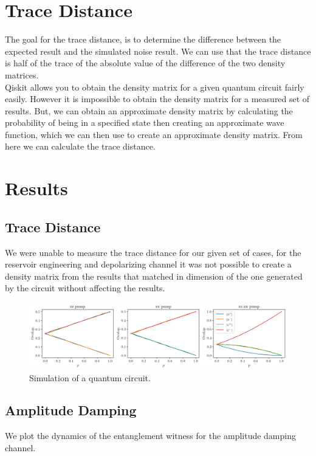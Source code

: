 \documentclass[12pt]{article}
\begin{document}
\section{Trace Distance}
        The goal for the trace distance, is to determine the difference between the expected result and the simulated noise result. We can use that the trace distance is half of the trace of the absolute value of the difference of the two density matrices. \\
        Qiskit allows you to obtain the density matrix for a given quantum circuit fairly easily. However it is impossible to obtain the density matrix for a measured set of results. But, we can obtain an approximate density matrix by calculating the probability of being in a specified state then creating an approximate wave function, which we can then use to create an approximate density matrix. From here we can calculate the trace distance.  

  \section{Results}
  \subsection{Trace Distance}
        We were unable to measure the trace distance for our given set of cases, for the reservoir engineering and depolarizing channel it was not possible to create a density matrix from the results that matched in dimension of the one generated by the circuit without affecting the results.

  \begin{figure}[h]
    \centering
    \includegraphics[width=\textwidth]{images/reservoir-engineering-simulation}
    \caption{Simulation of a quantum circuit.%
      \label{fig:reservoir-engineering-simulation}}
  \end{figure}
  \subsection{Amplitude Damping}
  We plot the dynamics of the entanglement witness for the amplitude damping channel.
  
\end{document}
